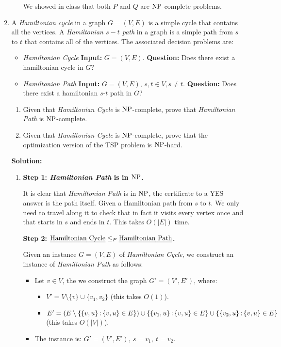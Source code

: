 \documentclass[../open-optimization/open-optimization.tex]{subfiles}
\begin{document}
\begin{enumerate}
\begin{enumerate}
	We showed in class that both $P$ and $Q$ are  $\text{NP}$-complete problems.
	
\end{enumerate}
\newpage

\item A {\em Hamiltonian cycle} in a graph $G = (V,E)$ is a simple cycle that contains all the
vertices. A {\em Hamiltonian $s-t$ path} in a graph is a simple path from $s$ to $t$ that
contains all of the vertices. The associated decision problems are:
\begin{itemize}
	\item {\em Hamiltonian Cycle} {\bf Input:} $G=(V,E)$. {\bf Question:} Does there exist a hamiltonian cycle in $G$?
	\item  {\em Hamiltonian Path} {\bf Input:} $G=(V,E)$, $s,t\in V, s\neq t$. {\bf Question:} Does there exist a hamiltonian $s$-$t$ path in $G$?
\end{itemize}
\begin{enumerate}
	\item  Given that {\em Hamiltonian Cycle} is $\text{NP}$-complete, prove that {\em Hamiltonian Path} is $\text{NP}$-complete.
	\item Given that {\em Hamiltonian Cycle} is $\text{NP}$-complete, prove that the optimization version of the TSP problem is $\text{NP}$-hard. 
\end{enumerate}

{\bf \Large Solution:}\\



\begin{enumerate}
	\item {\bf  Step 1: {\em Hamiltonian Path} is in $\text{NP}$.} 
	
	It is clear that {\em Hamiltonian Path} is in $\text{NP}$, the certificate to a YES answer is the path itself. Given a Hamiltonian path from $s$ to $t$. We only need to travel along it to check that in fact it visits every vertex once and that starts in $s$ and ends in $t$. This takes $O(|E|)$ time. 
	
 {\bf Step 2: $\text{{\em Hamiltonian Cycle}}\leq_P\text{{\em Hamiltonian Path}}$.} 
	
	Given an instance $G=(V,E)$ of {\em Hamiltonian Cycle}, we construct an instance of {\em Hamiltonian Path} as follows:
	\begin{itemize}
		\item Let $v\in V$, the we construct the graph $G'=(V',E')$, where:
		\begin{itemize}
			\item $V'=V\setminus\{v\}\cup\{v_1,v_2\}$ (this takes $O(1)$). 
			\item $E'=\left(E\setminus\{\{v,u\}{\,:\,} \{v,u\}\in E\}\right)\cup \{\{v_1,u\}{\,:\,} \{v,u\}\in E\}\cup \{\{v_2,u\}{\,:\,} \{v,u\}\in E\}$ (this takes $O(|V|)$).
		\end{itemize}
		\item The instance is: $G'=(V',E'),\ s=v_1,\ t=v_2$. 
	\end{itemize}
	

\end{enumerate}
\end{enumerate}
\end{document}
